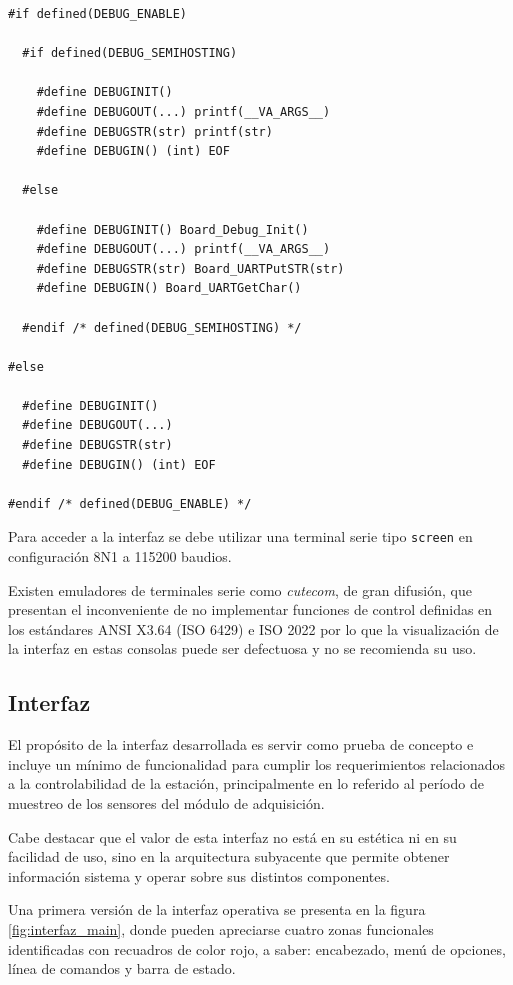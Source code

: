 \begin{lstlisting}[caption={Macros para habilitar/deshabilitar mensajes de depuración del código.},label={lst:debug}]
#if defined(DEBUG_ENABLE)

  #if defined(DEBUG_SEMIHOSTING)
	  
    #define DEBUGINIT()
    #define DEBUGOUT(...) printf(__VA_ARGS__)
    #define DEBUGSTR(str) printf(str)
    #define DEBUGIN() (int) EOF

  #else
  
    #define DEBUGINIT() Board_Debug_Init()
    #define DEBUGOUT(...) printf(__VA_ARGS__)
    #define DEBUGSTR(str) Board_UARTPutSTR(str)
    #define DEBUGIN() Board_UARTGetChar()
  
  #endif /* defined(DEBUG_SEMIHOSTING) */

#else
  
  #define DEBUGINIT()
  #define DEBUGOUT(...)
  #define DEBUGSTR(str)
  #define DEBUGIN() (int) EOF
  
#endif /* defined(DEBUG_ENABLE) */
\end{lstlisting}

Para acceder a la interfaz se debe utilizar una terminal serie tipo \texttt{screen} \citep{screen} en configuración 8N1 a 115200 baudios. 

Existen emuladores de terminales serie como \textit{cutecom}, de gran difusión, que presentan el inconveniente de no implementar funciones de control definidas en los estándares ANSI X3.64 (ISO 6429) e ISO 2022 por lo que la visualización de la interfaz en estas consolas puede ser defectuosa y no se recomienda su uso.


\subsection{Interfaz}
\label{subsec:interfaz}

El propósito de la interfaz desarrollada es servir como prueba de concepto e incluye un mínimo de funcionalidad para cumplir los requerimientos relacionados a la controlabilidad de la estación, principalmente en lo referido al período de muestreo de los sensores del módulo de adquisición. 

Cabe destacar que el valor de esta interfaz no está en su estética ni en su facilidad de uso, sino en la arquitectura subyacente que permite obtener información sistema y operar sobre sus distintos componentes.

Una primera versión de la interfaz operativa se presenta en la figura \ref{fig:interfaz_main}, donde pueden apreciarse cuatro zonas funcionales identificadas con recuadros de color rojo, a saber: encabezado, menú de opciones, línea de comandos y barra de estado. 

